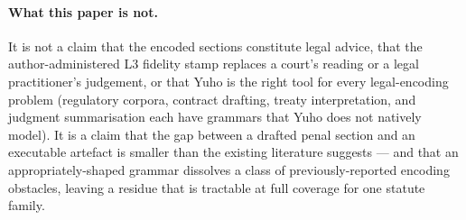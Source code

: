 \paragraph{What this paper is not.} It is not a claim that the encoded
sections constitute legal advice, that the author-administered L3
fidelity stamp replaces a court's reading or a legal practitioner's
judgement, or that Yuho is the right tool for every legal-encoding
problem (regulatory corpora, contract drafting, treaty interpretation,
and judgment summarisation each have grammars that Yuho does not
natively model). It is a claim that the gap between a drafted penal
section and an executable artefact is smaller than the existing
literature suggests --- and that an appropriately-shaped grammar
dissolves a class of previously-reported encoding obstacles, leaving a
residue that is tractable at full coverage for one statute family.

